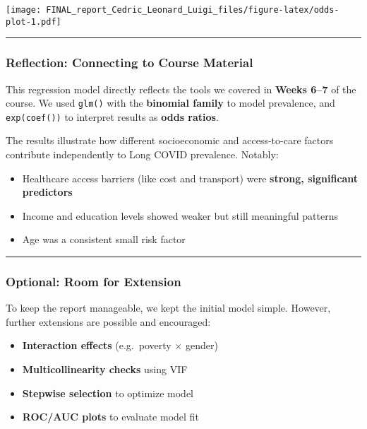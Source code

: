 \documentclass[
]{article}
\providecommand{\tightlist}{%
  \setlength{\itemsep}{0pt}\setlength{\parskip}{0pt}}
\begin{document}
\texttt{[image: FINAL\_report\_Cedric\_Leonard\_Luigi\_files/figure-latex/odds-plot-1.pdf]}

\begin{center}\rule{0.5\linewidth}{0.5pt}\end{center}

\subsubsection{Reflection: Connecting to Course
Material}\label{reflection-connecting-to-course-material}

This regression model directly reflects the tools we covered in
\textbf{Weeks 6--7} of the course. We used \texttt{glm()} with the
\textbf{binomial family} to model prevalence, and \texttt{exp(coef())}
to interpret results as \textbf{odds ratios}.

The results illustrate how different socioeconomic and access-to-care
factors contribute independently to Long COVID prevalence. Notably:

\begin{itemize}
\tightlist
\item
  Healthcare access barriers (like cost and transport) were
  \textbf{strong, significant predictors}
\item
  Income and education levels showed weaker but still meaningful
  patterns
\item
  Age was a consistent small risk factor
\end{itemize}

\begin{center}\rule{0.5\linewidth}{0.5pt}\end{center}

\subsubsection{Optional: Room for
Extension}\label{optional-room-for-extension}

To keep the report manageable, we kept the initial model simple.
However, further extensions are possible and encouraged:

\begin{itemize}
\tightlist
\item
  \textbf{Interaction effects} (e.g.~poverty × gender)
\item
  \textbf{Multicollinearity checks} using VIF
\item
  \textbf{Stepwise selection} to optimize model
\item
  \textbf{ROC/AUC plots} to evaluate model fit
\end{itemize}
\end{document}
